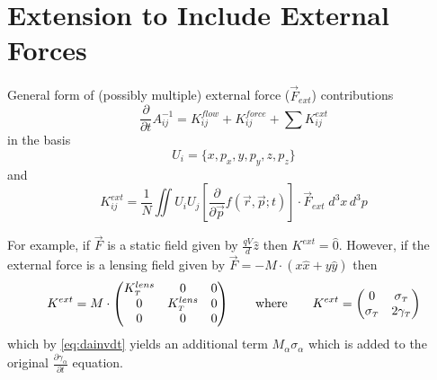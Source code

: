 
\section{Extension to Include External Forces}

General form of (possibly multiple) external force ($\vec{F}_{ext}$) contributions
\begin{equation}
  \frac{\partial}{\partial t} A^{-1}_{ij} = K^{flow}_{ij} + K^{force}_{ij} + \sum K^{ext}_{ij}
\end{equation}
in the basis
\begin{equation}
  U_{i} = \lbrace x, p_x, y, p_y, z, p_z \rbrace
\end{equation}
and
\begin{equation}
  K^{ext}_{ij} = \frac{1}{N} \iint U_i U_j \left [ \frac{\partial}{\partial \vec{p}} f(\vec{r}, \vec{p}; t) \right ] \cdot \vec{F}_{ext}\;d^{3}x\,d^{3}p
\end{equation}

For example, if $\vec{F}$ is a static field given by $\frac{qV}{d}\hat{z}$ then $K^{ext} = \hat{0}$. However, if the external force is a lensing field given by $\vec{F} = -M\cdot(x\hat{x}+y\hat{y})$ then 
\begin{equation}
  K^{ext} = M \cdot 
  \begin{pmatrix}
    K^{lens}_{{\scriptscriptstyle T}} & 0 & 0 \\
    0 & K^{lens}_{{\scriptscriptstyle T}} & 0 \\
    0 & 0 & 0
  \end{pmatrix}
  \qquad \text{where} \qquad
  K^{ext} = 
  \begin{pmatrix}
    0 & \sigma_{{\scriptscriptstyle T}} \\
    \sigma_{{\scriptscriptstyle T}} & 2 \gamma_{{\scriptscriptstyle T}}
  \end{pmatrix}
\end{equation}
which by \eqref{eq:dainvdt} yields an additional term $M_{\alpha} \sigma_{\alpha}$ which is added to the original $\frac{\partial \gamma_{\alpha}}{\partial t}$ equation.
